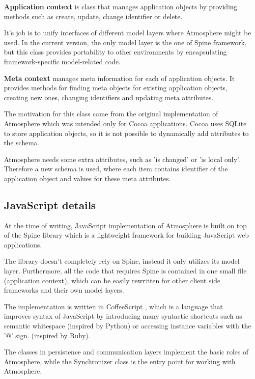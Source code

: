 \textbf{Application context} is class that manages application objects by providing methods such as create, update, change identifier or delete.

It's job is to unify interfaces of different model layers where Atmosphere might be used. In the current version, the only model layer is the one of Spine framework, but this class provides portability to other environments by encapsulating framework-specific model-related code.

\textbf{Meta context} manages meta information for each of application objects. It provides methods for finding meta objects for existing application objects, creating new ones, changing identifiers and updating meta attributes.

The motivation for this class came from the original implementation of Atmosphere which was intended only for Cocoa applications. Cocoa uses SQLite to store application objects, so it is not possible to dynamically add attributes to the schema.

Atmosphere needs some extra attributes, such as 'is changed' or 'is local only'. Therefore a new schema is used, where each item contains identifier of the application object and values for these meta attributes.

\subsection{JavaScript details}

At the time of writing, JavaScript implementation of Atmosphere is built on top of the Spine \citep{spinejs} library which is a lightweight framework for building JavaScript web applications.

The library doesn’t completely rely on Spine, instead it only utilizes its model layer. Furthermore, all the code that requires Spine is contained in one small file (application context), which can be easily rewritten for other client side frameworks and their own model layers.

The implementation is written in CoffeeScript \citep{coffeescript}, which is a language that improves syntax of JavaScript by introducing many syntactic shortcuts such as semantic whitespace (inspired by Python) or accessing instance variables with the '@' sign. (inspired by Ruby).

The classes in persistence and communication layers implement the basic roles of Atmosphere, while the Synchronizer class is the entry point for working with Atmosphere.

